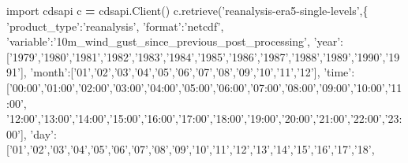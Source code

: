\documentclass[12pt,oneside]{reedthesis}
\newenvironment{Shaded}{\begin{snugshade}}{\end{snugshade}}
\newcommand{\ImportTok}[1]{#1}
\newcommand{\NormalTok}[1]{#1}
\newcommand{\OperatorTok}[1]{\textcolor[rgb]{0.81,0.36,0.00}{\textbf{#1}}}
\newcommand{\StringTok}[1]{\textcolor[rgb]{0.31,0.60,0.02}{#1}}
\begin{document}
\scriptsize

\vspace{0.4cm}
\begin{Shaded}
\begin{Highlighting}[]
      \ImportTok{import}\NormalTok{ cdsapi}
\NormalTok{      c }\OperatorTok{=}\NormalTok{ cdsapi.Client()}
\NormalTok{      c.retrieve(}\StringTok{'reanalysis-era5-single-levels'}\NormalTok{,\{}
       \StringTok{'product_type'}\NormalTok{:}\StringTok{'reanalysis'}\NormalTok{,}
       \StringTok{'format'}\NormalTok{:}\StringTok{'netcdf'}\NormalTok{,}
       \StringTok{'variable'}\NormalTok{:}\StringTok{'10m_wind_gust_since_previous_post_processing'}\NormalTok{,}
       \StringTok{'year'}\NormalTok{:[}\StringTok{'1979'}\NormalTok{,}\StringTok{'1980'}\NormalTok{,}\StringTok{'1981'}\NormalTok{,}\StringTok{'1982'}\NormalTok{,}\StringTok{'1983'}\NormalTok{,}\StringTok{'1984'}\NormalTok{,}\StringTok{'1985'}\NormalTok{,}\StringTok{'1986'}\NormalTok{,}\StringTok{'1987'}\NormalTok{,}\StringTok{'1988'}\NormalTok{,}\StringTok{'1989'}\NormalTok{,}\StringTok{'1990'}\NormalTok{,}\StringTok{'1991'}\NormalTok{],}
       \StringTok{'month'}\NormalTok{:[}\StringTok{'01'}\NormalTok{,}\StringTok{'02'}\NormalTok{,}\StringTok{'03'}\NormalTok{,}\StringTok{'04'}\NormalTok{,}\StringTok{'05'}\NormalTok{,}\StringTok{'06'}\NormalTok{,}\StringTok{'07'}\NormalTok{,}\StringTok{'08'}\NormalTok{,}\StringTok{'09'}\NormalTok{,}\StringTok{'10'}\NormalTok{,}\StringTok{'11'}\NormalTok{,}\StringTok{'12'}\NormalTok{],}
       \StringTok{'time'}\NormalTok{:[}\StringTok{'00:00'}\NormalTok{,}\StringTok{'01:00'}\NormalTok{,}\StringTok{'02:00'}\NormalTok{,}\StringTok{'03:00'}\NormalTok{,}\StringTok{'04:00'}\NormalTok{,}\StringTok{'05:00'}\NormalTok{,}\StringTok{'06:00'}\NormalTok{,}\StringTok{'07:00'}\NormalTok{,}\StringTok{'08:00'}\NormalTok{,}\StringTok{'09:00'}\NormalTok{,}\StringTok{'10:00'}\NormalTok{,}\StringTok{'11:00'}\NormalTok{,}
              \StringTok{'12:00'}\NormalTok{,}\StringTok{'13:00'}\NormalTok{,}\StringTok{'14:00'}\NormalTok{,}\StringTok{'15:00'}\NormalTok{,}\StringTok{'16:00'}\NormalTok{,}\StringTok{'17:00'}\NormalTok{,}\StringTok{'18:00'}\NormalTok{,}\StringTok{'19:00'}\NormalTok{,}\StringTok{'20:00'}\NormalTok{,}\StringTok{'21:00'}\NormalTok{,}\StringTok{'22:00'}\NormalTok{,}\StringTok{'23:00'}\NormalTok{],}
       \StringTok{'day'}\NormalTok{:[}\StringTok{'01'}\NormalTok{,}\StringTok{'02'}\NormalTok{,}\StringTok{'03'}\NormalTok{,}\StringTok{'04'}\NormalTok{,}\StringTok{'05'}\NormalTok{,}\StringTok{'06'}\NormalTok{,}\StringTok{'07'}\NormalTok{,}\StringTok{'08'}\NormalTok{,}\StringTok{'09'}\NormalTok{,}\StringTok{'10'}\NormalTok{,}\StringTok{'11'}\NormalTok{,}\StringTok{'12'}\NormalTok{,}\StringTok{'13'}\NormalTok{,}\StringTok{'14'}\NormalTok{,}\StringTok{'15'}\NormalTok{,}\StringTok{'16'}\NormalTok{,}\StringTok{'17'}\NormalTok{,}\StringTok{'18'}\NormalTok{,}

\end{Highlighting}
\end{Shaded}
\end{document}

